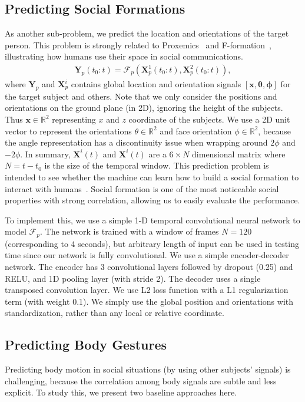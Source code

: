 \subsection{Predicting Social Formations}
As another sub-problem, we predict the location and orientations of the target person. This problem is strongly related to Proxemics~\cite{Hall66} and F-formation~\cite{kendon90}, illustrating how humans use their space in social communications.
\begin{gather}	
 \mathbf{Y}_p (t_0:t) = \mathcal{F}_p ( \mathbf{X}_p^1(t_0:t), \mathbf{X}_p^2(t_0:t)),
 \label{eq:pred_formation}
\end{gather}
where $\mathbf{Y}_p$ and $\mathbf{X}_p^i$ contains global location and orientation signals $[\mathbf{x}, \boldsymbol{\theta}, \boldsymbol{\phi} ]$ for the target subject and others.
Note that we only consider the positions and orientations on the ground plane (in 2D), ignoring the height of the subjects. Thus $\mathbf{x} \in \mathbb{R}^2 $ representing $x$ and $z$ coordinate of the subjects. We use a 2D unit vector to represent the orientations $\theta \in \mathbb {R}^2$ and face orientation $\phi \in \mathbb{R}^2$, because the angle representation has a discontinuity issue when wrapping around $2\phi$ and $-2\phi$. In summary, $\mathbf{X}^i(t)$ and $\mathbf{X}^i(t)$ are a $6 \times N$ dimensional matrix where $N = t- t_0$ is the size of the temporal window. This prediction problem is intended to see whether the machine can learn how to build a social formation to interact with humans~\cite{vazquez2017towards}. Social formation is one of the most noticeable social properties with strong correlation, allowing us to easily evaluate the performance.


To implement this, we use a simple 1-D temporal convolutional neural network to model $\mathcal{F}_p$. The network is trained with a window of frames $N=120$ (corresponding to 4 seconds), but arbitrary length of input can be used in testing time since our network is fully convolutional. We use a simple encoder-decoder network. The encoder has  3 convolutional layers followed by dropout (0.25) and RELU, and 1D pooling layer (with stride 2). The decoder uses a single transposed convolution layer. We use L2 loss function with a L1 regularization term (with weight 0.1). We simply use the global position and orientations with standardization, rather than any local or relative coordinate.

\subsection{Predicting Body Gestures}
Predicting body motion in social situations (by using other subjects' signals) is challenging, because the correlation among body signals are subtle and less explicit. To study this, we present two baseline approaches here. 

